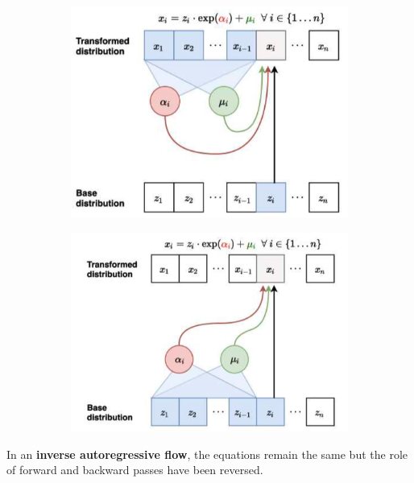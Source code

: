   \begin{figure}[H]
    \centering
    \begin{subfigure}[b]{0.45\textwidth}
      \centering
      \includegraphics[scale=0.36]{img/maf.png}
      \caption{}
      \label{fig:maf}
    \end{subfigure}
    \hfill 
    \begin{subfigure}[b]{0.48\textwidth}
      \centering
      \includegraphics[width=\textwidth]{img/iaf.png}
      \caption{}
      \label{fig:iaf}
    \end{subfigure}
    \caption{}
    \label{fig:maf_vs_iaf}
  \end{figure}

  In an \textbf{inverse autoregressive flow}, the equations remain the same but the role of forward and backward passes have been reversed. 

